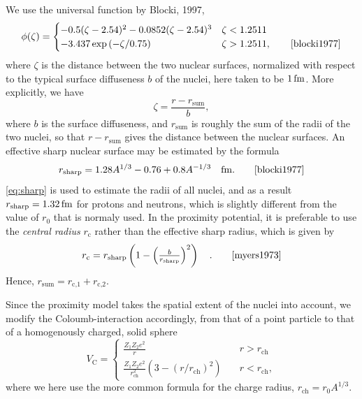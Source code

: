 We use the universal function by Blocki, 1997,
\begin{equation}
\phi(\zeta)= \begin{cases}-0.5(\zeta-2.54)^2-0.0852(\zeta-2.54)^3 & \zeta < 1.2511 \\
-3.437\exp{(-\zeta/0.75)} & \zeta > 1.2511,\qquad\cite{blocki1977}
\end{cases}\label{eq:prox}
\end{equation}
where $\zeta$ is the distance between the two nuclear surfaces, normalized with respect to the typical surface diffuseness $b$ of the nuclei, here taken to be $\unit[1]{fm}$\cite{blocki1977}. More explicitly, we have
\begin{equation}
\zeta = \frac{r - r_\text{sum}}{b},
\end{equation}
where $b$ is the surface diffuseness, and $r_\text{sum}$ is roughly the sum of the radii of the two nuclei, so that $r-r_\text{sum}$ gives the distance between the nuclear surfaces\cite{blocki1977}. An effective sharp nuclear surface may be estimated by the formula
\begin{equation}
r_\text{sharp} = 1.28 A^{1/3} - 0.76 + 0.8 A^{-1/3}\quad\unit{fm}.\qquad\cite{blocki1977}\label{eq:sharp}
\end{equation}
\autoref{eq:sharp} is used to estimate the radii of all nuclei, and as a result $r_\text{sharp}=\unit[1.32]{fm}$ for protons and neutrons, which is slightly different from the value of $r_0$ that is normaly used.
In the proximity potential, it is preferable to use the \emph{central radius} $r_\text{c}$ rather than the effective sharp radius\cite{blocki1977}, which is given by 
\begin{equation}
r_\text{c} =r_\text{sharp} \left(1-\left(\tfrac{b}{r_\text{sharp}}\right)^2\right)\quad.\qquad\cite{myers1973}
\end{equation}
Hence, $r_\text{sum} = r_\text{c,1}+r_\text{c,2}$. 


Since the proximity model takes the spatial extent of the nuclei into account, we modify the Coloumb-interaction accordingly, from that of a point particle to that of a homogenously charged, solid sphere
\begin{equation}
V_\text{C} = \begin{cases}\frac{Z_1 Z_2 e^2}{r} &\quad r>r_\text{ch} \\ \frac{Z_1 Z_2 e^2}{r_\text{ch}^2}(3-(r/r_\text{ch})^2) &\quad r<r_\text{ch}, \end{cases}
\end{equation}
where we here use the more common formula for the charge radius, $r_\text{ch} = r_0 A^{1/3}$.

